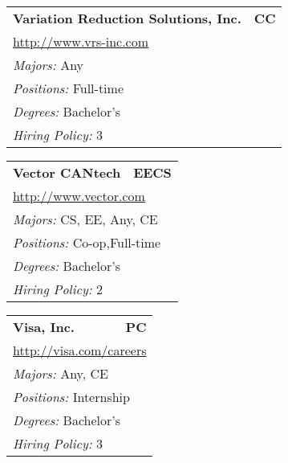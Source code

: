 \documentclass[twoside]{article}
\begin{document}
\begin{center}
\begin{multicols}{3}
\begin{FlushLeft}
\begin{minipage}{.9\columnwidth}
\end{minipage}
 
\begin{minipage}{.9\columnwidth}\begin{tabularx}{.95\columnwidth}{Xr}
                 {\Large\bf Variation Reduction Solutions, Inc.} & {\Large\bf CC}\\
    \multicolumn{2}{p{.95\columnwidth}}{\url{http://www.vrs-inc.com}}\\
    \multicolumn{2}{p{.95\columnwidth}}{\emph{Majors:} Any}\\
    \multicolumn{2}{p{.95\columnwidth}}{\emph{Positions:} Full-time}\\
    \multicolumn{2}{p{.95\columnwidth}}{\emph{Degrees:} Bachelor's}\\
    \multicolumn{2}{p{.95\columnwidth}}{\emph{Hiring Policy:} 3}\\
    \end{tabularx}
    
\end{minipage}
 
\begin{minipage}{.9\columnwidth}\begin{tabularx}{.95\columnwidth}{Xr}
                 {\Large\bf Vector CANtech} & {\Large\bf EECS}\\
    \multicolumn{2}{p{.95\columnwidth}}{\url{http://www.vector.com}}\\
    \multicolumn{2}{p{.95\columnwidth}}{\emph{Majors:} CS, EE, Any, CE}\\
    \multicolumn{2}{p{.95\columnwidth}}{\emph{Positions:} Co-op,Full-time}\\
    \multicolumn{2}{p{.95\columnwidth}}{\emph{Degrees:} Bachelor's}\\
    \multicolumn{2}{p{.95\columnwidth}}{\emph{Hiring Policy:} 2}\\
    \end{tabularx}
    
\end{minipage}
 
\begin{minipage}{.9\columnwidth}\begin{tabularx}{.95\columnwidth}{Xr}
                 {\Large\bf Visa, Inc.} & {\Large\bf PC}\\
    \multicolumn{2}{p{.95\columnwidth}}{\url{http://visa.com/careers}}\\
    \multicolumn{2}{p{.95\columnwidth}}{\emph{Majors:} Any, CE}\\
    \multicolumn{2}{p{.95\columnwidth}}{\emph{Positions:} Internship}\\
    \multicolumn{2}{p{.95\columnwidth}}{\emph{Degrees:} Bachelor's}\\
    \multicolumn{2}{p{.95\columnwidth}}{\emph{Hiring Policy:} 3}\\
    \end{tabularx}
    

\end{minipage}
\end{FlushLeft}
\end{multicols}
\end{center}
\end{document}
